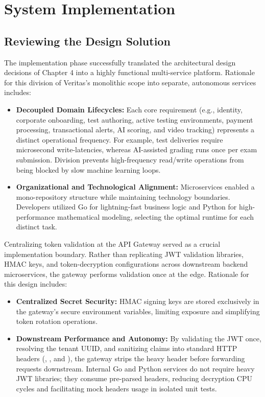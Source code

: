 \section{System Implementation}

\subsection{Reviewing the Design Solution}
The implementation phase successfully translated the architectural design decisions of Chapter 4 into a highly functional multi-service platform. Rationale for this division of Veritas's monolithic scope into separate, autonomous services includes:
\begin{itemize}
    \item \textbf{Decoupled Domain Lifecycles:} Each core requirement (e.g., identity, corporate onboarding, test authoring, active testing environments, payment processing, transactional alerts, AI scoring, and video tracking) represents a distinct operational frequency. For example, test deliveries require microsecond write-latencies, whereas AI-assisted grading runs once per exam submission. Division prevents high-frequency read/write operations from being blocked by slow machine learning loops.
    \item \textbf{Organizational and Technological Alignment:} Microservices enabled a mono-repository structure while maintaining technology boundaries. Developers utilized Go for lightning-fast business logic and Python for high-performance mathematical modeling, selecting the optimal runtime for each distinct task.
\end{itemize}

Centralizing token validation at the API Gateway served as a crucial implementation boundary. Rather than replicating JWT validation libraries, HMAC keys, and token-decryption configurations across downstream backend microservices, the gateway performs validation once at the edge. Rationale for this design includes:
\begin{itemize}
    \item \textbf{Centralized Secret Security:} HMAC signing keys are stored exclusively in the gateway's secure environment variables, limiting exposure and simplifying token rotation operations.
    \item \textbf{Downstream Performance and Autonomy:} By validating the JWT once, resolving the tenant UUID, and sanitizing claims into standard HTTP headers (, , and ), the gateway strips the heavy  header before forwarding requests downstream. Internal Go and Python services do not require heavy JWT libraries; they consume pre-parsed headers, reducing decryption CPU cycles and facilitating mock headers usage in isolated unit tests.
\end{itemize}

